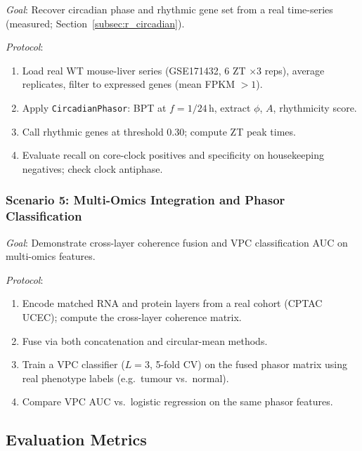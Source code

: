 \documentclass[preprint,12pt,amsmath,amssymb,superscriptaddress,floatfix]{revtex4-2}
\begin{document}
\textit{Goal}: Recover circadian phase and rhythmic gene set from a real
time-series (measured; Section~\ref{subsec:r_circadian}).

\textit{Protocol}:
\begin{enumerate}
    \item Load real WT mouse-liver series (GSE171432, 6 ZT $\times$3 reps),
    average replicates, filter to expressed genes (mean FPKM $>1$).
    \item Apply \texttt{CircadianPhasor}: BPT at $f=1/24$\,h, extract
    $\phi$, $A$, rhythmicity score.
    \item Call rhythmic genes at threshold 0.30; compute ZT peak times.
    \item Evaluate recall on core-clock positives and specificity on
    housekeeping negatives; check clock antiphase.
\end{enumerate}

\subsubsection{Scenario 5: Multi-Omics Integration and Phasor Classification}

\textit{Goal}: Demonstrate cross-layer coherence fusion and
VPC classification AUC on multi-omics features.

\textit{Protocol}:
\begin{enumerate}
    \item Encode matched RNA and protein layers from a real
    cohort (CPTAC UCEC); compute the cross-layer coherence matrix.
    \item Fuse via both concatenation and circular-mean methods.
    \item Train a VPC classifier ($L=3$, 5-fold CV) on the fused phasor
    matrix using real phenotype labels (e.g.\ tumour vs.\ normal).
    \item Compare VPC AUC vs.\ logistic regression on the same phasor features.
\end{enumerate}

\subsection{Evaluation Metrics}
\label{subsec:metrics}
\end{document}
